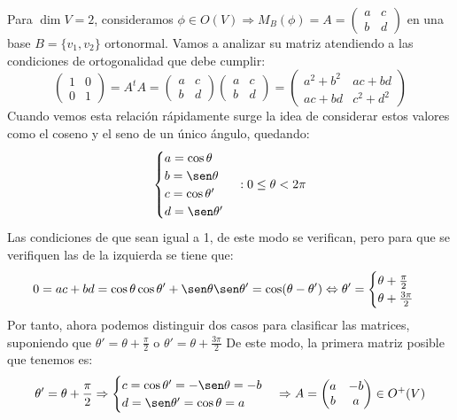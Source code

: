 \documentclass[10pt,a4paper,openright]{book}
\begin{document}
Para $\dim V = 2$, consideramos $\phi\in O(V)\Rightarrow M_B(\phi) = A = \begin{pmatrix} a & c \\ b & d\end{pmatrix}$ en una base $B = \{v_1, v_2\}$ ortonormal. Vamos a analizar su matriz atendiendo a las condiciones de ortogonalidad que debe cumplir:
$$\begin{pmatrix} 1 & 0 \\ 0 & 1 \end{pmatrix} = A^t A = \begin{pmatrix} a & c  \\ b & d \end{pmatrix} \begin{pmatrix} a & c  \\ b & d  \end{pmatrix} = \begin{pmatrix} a^2+b^2 & ac+bd  \\ ac+bd &c^2 + d^2 \end{pmatrix} $$
Cuando vemos esta relación rápidamente surge la idea de considerar estos valores como el coseno y el seno de un único ángulo, quedando:
$$\begin{cases} a = \cos \theta \\ b = \sen \theta \\ c = \cos \theta' \\ d = \sen \theta'
\end{cases}: 0 \leq \theta < 2\pi$$
Las condiciones de que sean igual a 1, de este modo se verifican, pero para que se verifiquen las de la izquierda se tiene que:
$$0 = ac+bd = \cos \theta \cos \theta ' + \sen \theta \sen \theta' = \cos(\theta - \theta ') \Leftrightarrow \theta ' = \begin{cases} \theta + \frac{\pi}{2}  \\ \theta + \frac{ 3 \pi}{2}\end{cases} $$
Por tanto, ahora podemos distinguir dos casos para clasificar las matrices, suponiendo que $\theta ' = \theta +\frac{\pi}{2}$ o $\theta ' = \theta + \frac{3\pi}{2}$
De este modo, la primera matriz posible que tenemos es:
$$\theta' = \theta +\frac{\pi}{2} \Rightarrow \begin{cases} c = \cos \theta' = -\sen \theta = -b \\ d = \sen \theta' = \cos\theta = a \end{cases} \Rightarrow A = \begin{pmatrix} a & -b \\ b & a\end{pmatrix} \in O^+(V)$$
\end{document}
